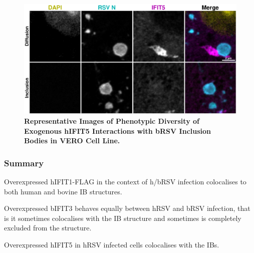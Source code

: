 \begin{figure}
    \centering
    \includegraphics[width=1\linewidth]{09. Chapter 4/Figs/04. Overexpression/03. IFIT5/06. i5-brsv.pdf}
    \caption[Representative Images of Phenotypic Diversity of Exogenous hIFIT5 Interactions with bRSV Inclusion Bodies in VERO Cell Line.]{\textbf{Representative Images of Phenotypic Diversity of Exogenous hIFIT5 Interactions with bRSV Inclusion Bodies in VERO Cell Line.} }
    \label{fig:Representative Images of Phenotypic Diversity of Exogenous hIFIT5 Interactions with bRSV Inclusion Bodies in VERO Cell Line}
\end{figure}

\subsubsection{Summary} \label{Summary-oe}
Overexpressed hIFIT1-FLAG in the context of h/bRSV infection colocalises to both human and bovine IB structures.

Overexpressed bIFIT3 behaves equally between hRSV and bRSV infection, that is it sometimes colocalises with the IB structure and sometimes is completely excluded from the structure.

Overexpressed hIFIT5 in hRSV infected cells colocalises with the IBs.